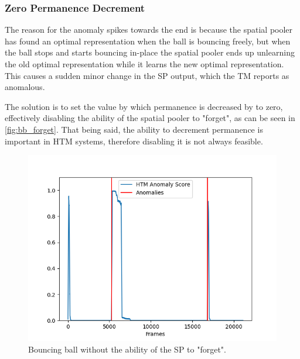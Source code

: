 \subsubsection{Zero Permanence Decrement}
The reason for the anomaly spikes towards the end is because the spatial pooler has found an optimal representation when the ball is bouncing freely, but when the ball stops and starts bouncing in-place the spatial pooler ends up unlearning the old optimal representation while it learns the new optimal representation. This causes a sudden minor change in the SP output, which the TM reports as anomalous.
\par
The solution is to set the value by which permanence is decreased by to zero, effectively disabling the ability of the spatial pooler to "forget", as can be seen in \autoref{fig:bb_forget}. That being said, the ability to decrement permanence is important in HTM systems, therefore disabling it is not always feasible.
\begin{figure}[H]
    \centering
    \includegraphics[width=\textwidth]{resources/experiments/bouncing_ball/bb_anoms_unforgetting.png}
    \caption{Bouncing ball without the ability of the SP to "forget".}
    \label{fig:bb_forget}
\end{figure}
